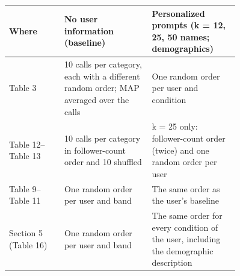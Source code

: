 \begin{tabular}{lp{0.38\linewidth}p{0.38\linewidth}}
\toprule
Where & No user information (baseline) & Personalized prompts (k = 12, 25, 50 names; demographics) \\
\midrule
Table 3 & 10 calls per category, each with a different random order; MAP averaged over the calls & One random order per user and condition \\
Table 12--Table 13 & 10 calls per category in follower-count order and 10 shuffled & k = 25 only: follower-count order (twice) and one random order per user \\
Table 9--Table 11 & One random order per user and band & The same order as the user's baseline \\
Section 5 (Table 16) & One random order per user and band & The same order for every condition of the user, including the demographic description \\
\bottomrule
\end{tabular}
